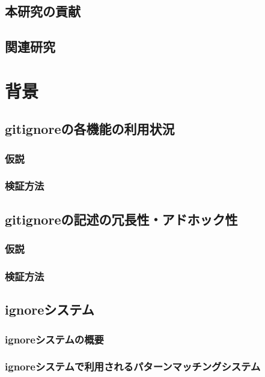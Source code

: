 \documentclass[xelatex,ja=standard,fontsize=10.5pt]{bxjsreport}
\begin{document}
\section{本研究の貢献}

\section{関連研究}

%
\chapter{背景}

\section{\textrm{gitignore}の各機能の利用状況}

\subsection{仮説}

\subsection{検証方法}

\section{\textrm{gitignore}の記述の冗長性・アドホック性}

\subsection{仮説}

\subsection{検証方法}

\section{\textrm{ignore}システム}

\subsection{\textrm{ignore}システムの概要}

\subsection{\textrm{ignore}システムで利用されるパターンマッチングシステム}
\end{document}
